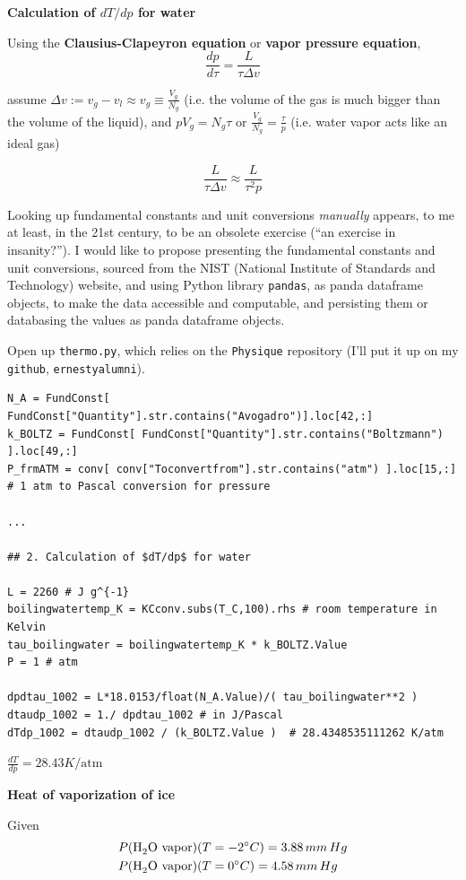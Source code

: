 \documentclass[twoside]{amsart}
\theoremstyle{plain}
\theoremstyle{definition}
\newcommand{\problemhead}[1]
  {
   \noindent{\small\bf Problem #1.}
   }
\begin{document}
\problemhead{2} \textbf{Calculation of $dT/dp$ for water}

Using the \textbf{Clausius-Clapeyron equation} or \textbf{vapor pressure equation}, 
\[
\frac{dp}{d\tau} = \frac{L}{\tau \Delta v}
\]

assume $\Delta v := v_g - v_l \approx v_g \equiv \frac{V_g}{N_g}$ (i.e. the volume of the gas is much bigger than the volume of the liquid), and $pV_g = N_g \tau$ or $\frac{V_g}{N_g} = \frac{\tau}{p}$ (i.e. water vapor acts like an ideal gas)

\[
\frac{L}{ \tau \Delta v} \approx \frac{L}{ \tau^2 p}
\] 

Looking up fundamental constants and unit conversions \emph{manually} appears, to me at least, in the 21st century, to be an obsolete exercise (``an exercise in insanity?'').  I would like to propose presenting the fundamental constants and unit conversions, sourced from the NIST (National Institute of Standards and Technology) website, and using Python library \verb|pandas|, as panda dataframe objects, to make the data accessible and computable, and persisting them or databasing the values as panda dataframe objects.  

Open up \verb|thermo.py|, which relies on the \verb|Physique| repository (I'll put it up on my \verb|github|, \verb|ernestyalumni|).  

\begin{lstlisting}
N_A = FundConst[ FundConst["Quantity"].str.contains("Avogadro")].loc[42,:]
k_BOLTZ = FundConst[ FundConst["Quantity"].str.contains("Boltzmann") ].loc[49,:]
P_frmATM = conv[ conv["Toconvertfrom"].str.contains("atm") ].loc[15,:] # 1 atm to Pascal conversion for pressure

...

## 2. Calculation of $dT/dp$ for water

L = 2260 # J g^{-1}
boilingwatertemp_K = KCconv.subs(T_C,100).rhs # room temperature in Kelvin
tau_boilingwater = boilingwatertemp_K * k_BOLTZ.Value
P = 1 # atm

dpdtau_1002 = L*18.0153/float(N_A.Value)/( tau_boilingwater**2 )
dtaudp_1002 = 1./ dpdtau_1002 # in J/Pascal
dTdp_1002 = dtaudp_1002 / (k_BOLTZ.Value )  # 28.4348535111262 K/atm
\end{lstlisting}

$\boxed{ \frac{dT}{dp} = 28.43 K/\text{atm} }$


\problemhead{3} \textbf{Heat of vaporization of ice}

Given
\[
\begin{aligned}
  & P(\ce{H2O} \text{ vapor} )(T = -2^{\circ}C) = 3.88 \, mm \, Hg \\ 
  & P(\ce{H2O} \text{ vapor})(T = 0^{\circ}C) = 4.58 \, mm \, Hg 
\end{aligned}
\]
\end{document}
